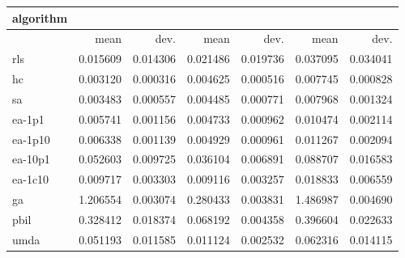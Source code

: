 \begin{tabular}{@{}l*{6}{>{{}}N{1}{2}}@{}}
\toprule
{algorithm} &  &  &  \\
\midrule
& {mean} & {dev.} & {mean} & {dev.} & {mean} & {dev.} \\
\midrule
rls & 0.015609 & 0.014306 & 0.021486 & 0.019736 & 0.037095 & 0.034041 \\
 hc & 0.003120 & 0.000316 & 0.004625 & 0.000516 & 0.007745 & 0.000828 \\
 sa & 0.003483 & 0.000557 & 0.004485 & 0.000771 & 0.007968 & 0.001324 \\
 ea-1p1 & 0.005741 & 0.001156 & 0.004733 & 0.000962 & 0.010474 & 0.002114 \\
 ea-1p10 & 0.006338 & 0.001139 & 0.004929 & 0.000961 & 0.011267 & 0.002094 \\
 ea-10p1 & 0.052603 & 0.009725 & 0.036104 & 0.006891 & 0.088707 & 0.016583 \\
 ea-1c10 & 0.009717 & 0.003303 & 0.009116 & 0.003257 & 0.018833 & 0.006559 \\
 ga & 1.206554 & 0.003074 & 0.280433 & 0.003831 & 1.486987 & 0.004690 \\
 pbil & 0.328412 & 0.018374 & 0.068192 & 0.004358 & 0.396604 & 0.022633 \\
 umda & 0.051193 & 0.011585 & 0.011124 & 0.002532 & 0.062316 & 0.014115 \\
 \bottomrule
\end{tabular}
